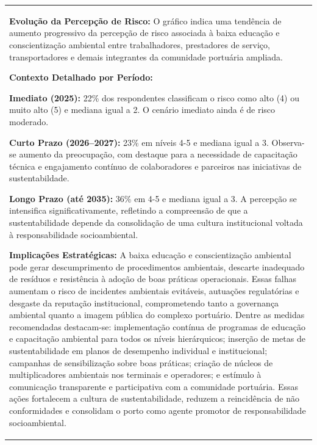 \documentclass[
  portuguese,
  letterpaper,
  DIV=11,
  numbers=noendperiod]{scrreprt}
\begin{document}
\begin{tcolorbox}[enhanced jigsaw, breakable, leftrule=.75mm, opacitybacktitle=0.6, coltitle=black, rightrule=.15mm, colbacktitle=quarto-callout-tip-color!10!white, colframe=quarto-callout-tip-color-frame, titlerule=0mm, bottomtitle=1mm, colback=white, toprule=.15mm, toptitle=1mm, left=2mm, title=\textcolor{quarto-callout-tip-color}{\faLightbulb}\hspace{0.5em}{Destaques}, opacityback=0, bottomrule=.15mm, arc=.35mm]

\begin{longtable}[]{@{}
  >{\raggedright\arraybackslash}p{}@{}}
\toprule\noalign{}
\endhead
\bottomrule\noalign{}
\endlastfoot
\textbf{Evolução da Percepção de Risco:} O gráfico indica uma tendência
de aumento progressivo da percepção de risco associada à baixa educação
e conscientização ambiental entre trabalhadores, prestadores de serviço,
transportadores e demais integrantes da comunidade portuária ampliada.

\textbf{Contexto Detalhado por Período:}

\textbf{Imediato (2025):} 22\% dos respondentes classificam o risco como
alto (4) ou muito alto (5) e mediana igual a 2. O cenário imediato ainda
é de risco moderado. \textbar{}

\textbf{Curto Prazo (2026--2027):} 23\% em níveis 4-5 e mediana igual a
3. Observa-se aumento da preocupação, com destaque para a necessidade de
capacitação técnica e engajamento contínuo de colaboradores e parceiros
nas iniciativas de sustentabildade. \textbar{}

\textbf{Longo Prazo (até 2035):} 36\% em 4-5 e mediana igual a 3. A
percepção se intensifica significativamente, refletindo a compreensão de
que a sustentabilidade depende da consolidação de uma cultura
institucional voltada à responsabilidade socioambiental.

\textbf{Implicações Estratégicas:} A baixa educação e conscientização
ambiental pode gerar descumprimento de procedimentos ambientais,
descarte inadequado de resíduos e resistência à adoção de boas práticas
operacionais. Essas falhas aumentam o risco de incidentes ambientais
evitáveis, autuações regulatórias e desgaste da reputação institucional,
comprometendo tanto a governança ambiental quanto a imagem pública do
complexo portuário. Dentre as medidas recomendadas destacam-se:
implementação contínua de programas de educação e capacitação ambiental
para todos os níveis hierárquicos; inserção de metas de sustentabilidade
em planos de desempenho individual e institucional; campanhas de
sensibilização sobre boas práticas; criação de núcleos de
multiplicadores ambientais nos terminais e operadores; e estímulo à
comunicação transparente e participativa com a comunidade portuária.
Essas ações fortalecem a cultura de sustentabilidade, reduzem a
reincidência de não conformidades e consolidam o porto como agente
promotor de responsabilidade socioambiental. \\
\end{longtable}

\end{tcolorbox}
\end{document}
